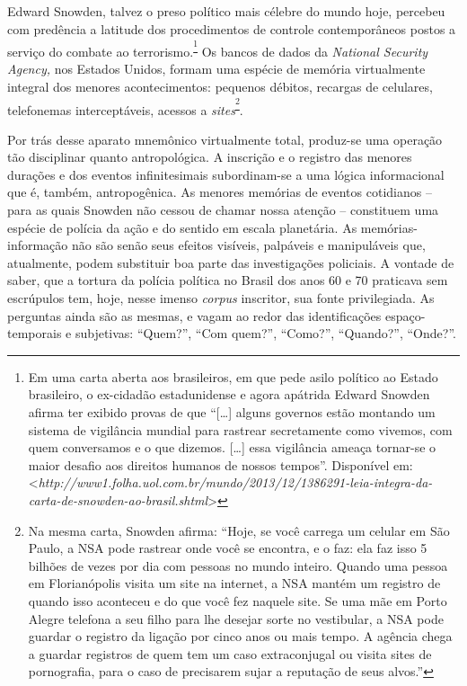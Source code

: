 Edward Snowden, talvez o preso político mais célebre do mundo hoje,
percebeu com predência a latitude dos procedimentos de controle
contemporâneos postos a serviço do combate ao
terrorismo.\textsuperscript{\footnote{Em uma carta aberta aos
  brasileiros, em que pede asilo político ao Estado brasileiro, o
  ex-cidadão estadunidense e agora apátrida Edward Snowden afirma ter
  exibido provas de que ``{[}\ldots{}{]} alguns governos estão montando
  um sistema de vigilância mundial para rastrear secretamente como
  vivemos, com quem conversamos e o que dizemos. {[}\ldots{}{]} essa
  vigilância ameaça tornar-se o maior desafio aos direitos humanos de
  nossos tempos''. Disponível em:
  \textless{}{\emph{http://www1.folha.uol.com.br/mundo/2013/12/1386291-leia-integra-da-carta-de-snowden-ao-brasil.shtml}}\textgreater{}}}
Os bancos de dados da \emph{National Security Agency, }nos Estados
Unidos, formam uma espécie de memória virtualmente integral dos menores
acontecimentos: pequenos débitos, recargas de celulares, telefonemas
interceptáveis, acessos a \emph{sites}\textsuperscript{\footnote{Na
  mesma carta, Snowden afirma: ``Hoje, se você carrega um celular em São
  Paulo, a NSA pode rastrear onde você se encontra, e o faz: ela faz
  isso 5 bilhões de vezes por dia com pessoas no mundo inteiro. Quando
  uma pessoa em Florianópolis visita um site na internet, a NSA mantém
  um registro de quando isso aconteceu e do que você fez naquele site.
  Se uma mãe em Porto Alegre telefona a seu filho para lhe desejar sorte
  no vestibular, a NSA pode guardar o registro da ligação por cinco anos
  ou mais tempo. A agência chega a guardar registros de quem tem um caso
  extraconjugal ou visita sites de pornografia, para o caso de
  precisarem sujar a reputação de seus alvos.''}}.

Por trás desse aparato mnemônico virtualmente total, produz-se uma
operação tão disciplinar quanto antropológica. A inscrição e o registro
das menores durações e dos eventos infinitesimais subordinam-se a uma
lógica informacional que é, também, antropogênica. As menores memórias
de eventos cotidianos -- para as quais Snowden não cessou de chamar
nossa atenção -- constituem uma espécie de polícia da ação e do sentido
em escala planetária. As memórias-informação não são senão seus efeitos
visíveis, palpáveis e manipuláveis que, atualmente, podem substituir boa
parte das investigações policiais. A vontade de saber, que a tortura da
polícia política no Brasil dos anos 60 e 70 praticava sem escrúpulos
tem, hoje, nesse imenso \emph{corpus }inscritor, sua fonte privilegiada.
As perguntas ainda são as mesmas, e vagam ao redor das identificações
espaço-temporais e subjetivas: ``Quem?'', ``Com quem?'', ``Como?'',
``Quando?'', ``Onde?''.

